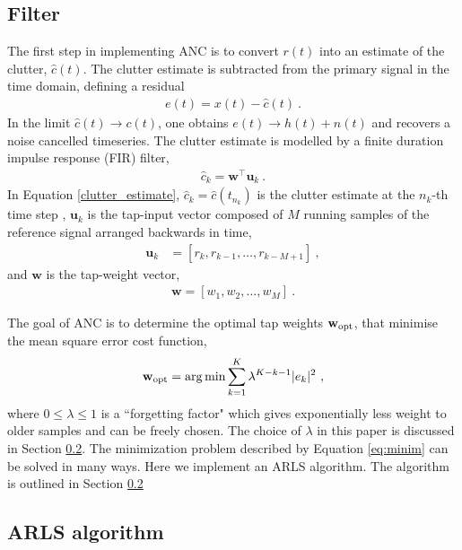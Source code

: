 \documentclass[pra,superscriptaddress,reprint,amsmath,amssymb,nofootinbib]{revtex4-2}
\begin{document}
\subsection{Filter}

The first step in implementing ANC is to convert $r(t)$ into an estimate of the clutter, $\hat{c}(t)$. The clutter estimate is subtracted from the primary signal in the time domain, defining a residual
\begin{eqnarray}
	e(t) = x(t) - \hat{c}(t) \ .\label{eq:error_estimate}
\end{eqnarray}
In the limit $\hat{c}(t) \to c(t)$, one obtains	$e(t) \to h(t) + n(t)$ and recovers a noise cancelled timeseries. The clutter estimate is modelled by a finite duration impulse response (FIR) filter,
\begin{eqnarray}
	\hat{c}_k = \mathbf{w}^{\intercal}\mathbf{u}_k \ . \label{clutter_estimate}
\end{eqnarray}
In Equation \eqref{clutter_estimate}, ${\hat c}_k = {\hat c}(t_{n_k})$ is the clutter estimate at the $n_k$-th time step , $\mathbf{u}_k$ is the tap-input vector composed of $M$ running samples of the reference signal arranged backwards in time,
 \begin{eqnarray}
 	\mathbf{u}_k &= [r_k, r_{k-1}, \dots, r_{k-M+1}] \ ,
 \end{eqnarray}
and $\mathbf{w}$ is the tap-weight vector,
 \begin{eqnarray}
	\mathbf{w} = [w_1, w_{2}, \dots, w_{M}] \ .
\end{eqnarray}

The goal of ANC is to determine the optimal tap weights $\mathbf{w}_{\rm opt}$, that minimise the mean square error cost function,
\begin{eqnarray}
	\mathbf{w}_{\rm opt} = \arg \min \sum_{k=1}^{K} \lambda^{K-k-1} |e_k|^2 \ , \label{eq:minim}
\end{eqnarray}
where $0 \leq \lambda \leq 1$ is a ``forgetting factor" which gives exponentially less weight to older samples and can be freely chosen. The choice of $\lambda$ in this paper is discussed in Section \ref{sec:ARLS}. The minimization problem described by Equation \eqref{eq:minim} can be solved in many ways. Here we implement an ARLS algorithm. The algorithm is outlined in Section \ref{sec:ARLS}

\subsection{ARLS algorithm}
\label{sec:ARLS}
\end{document}
